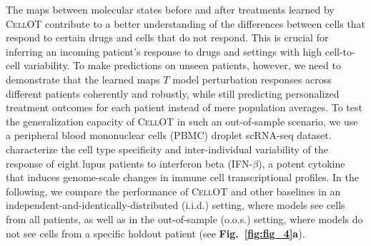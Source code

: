 The maps between molecular states before and after treatments learned by \textsc{CellOT} contribute to a better understanding of the differences between cells that respond to certain drugs and cells that do not respond. This is crucial for inferring an incoming patient's response to drugs and settings with high cell-to-cell variability.
To make predictions on unseen patients, however, we need to demonstrate that the learned maps $T$ model perturbation responses across different patients coherently and robustly, while still predicting personalized treatment outcomes for each patient instead of mere population averages.
To test the generalization capacity of \textsc{CellOT} in such an out-of-sample scenario, we use a peripheral blood mononuclear cells (PBMC) droplet scRNA-seq dataset. \citet{kang2018multiplexed} characterize the cell type specificity and inter-individual variability of the response of eight lupus patients to interferon beta (IFN-$\beta$), a potent cytokine that induces genome-scale changes in immune cell transcriptional profiles.
In the following, we compare the performance of \textsc{CellOT} and other baselines in an independent-and-identically-distributed (i.i.d.) setting, where models see cells from all patients, as well as in the out-of-sample (o.o.s.) setting, where models do not see cells from a specific holdout patient (see \textbf{Fig.~\ref{fig:fig_4}a}).

